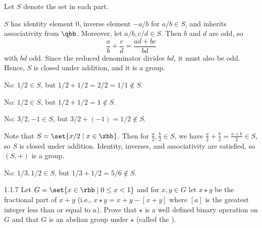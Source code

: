 \begin{sol}
    Let $S$ denote the set in each part.
    \begin{subexercises}
        \item $S$ has identity element $0$, inverse element $-a/b$ for $a/b \in S$, and inherits associativity from $\qbb$.
	    Moreover, let $a/b, c/d \in S$. Then $b$ and $d$ are odd, so
        \[
        	\frac ab + \frac cd = \frac{ad + bc}{bd}
        \]
        with $bd$ odd.
	    Since the reduced denominator divides $bd$, it must also be odd.
	    Hence, $S$ is closed under addition, and it is a group.
        \item No: $1/2 \in S$, but $1/2 + 1/2 = 2/2 = 1/1 \notin S$.
        \item No: $1/2 \in S$, but $1/2 + 1/2 = 1 \notin S$.
        \item No: $3/2, -1 \in S$, but $3/2 + (-1) = 1/2 \notin S$.
        \item Note that $S = \set{x/2 \mid x \in \zbb}$.
        Then for $\frac{a}{2}, \frac{b}{2} \in S$, we have $\frac{a}{2} + \frac{b}{2} = \frac{a + b}{2} \in S$, so $S$ is closed under addition.
        Identity, inverses, and associativity are satisfied, so $(S, +)$ is a group.
        \item No: $1/3, 1/2 \in S$, but $1/3 + 1/2 = 5/6 \notin S$. \qedhere
    \end{subexercises}
\end{sol}

\begin{exercise}{1.1.7}
    Let $G = \set{ x \in \rbb \mid 0 \leq x < 1 }$ and for $x, y \in G$ let $x \star y$ be the fractional part of $x + y$ (i.e., $x \star y = x + y - [x + y]$ where $[a]$ is the greatest integer less than or equal to $a$).
	Prove that $\star$ is a well defined binary operation on $G$ and that $G$ is an abelian group under $\star$ (called the ).
\end{exercise}

